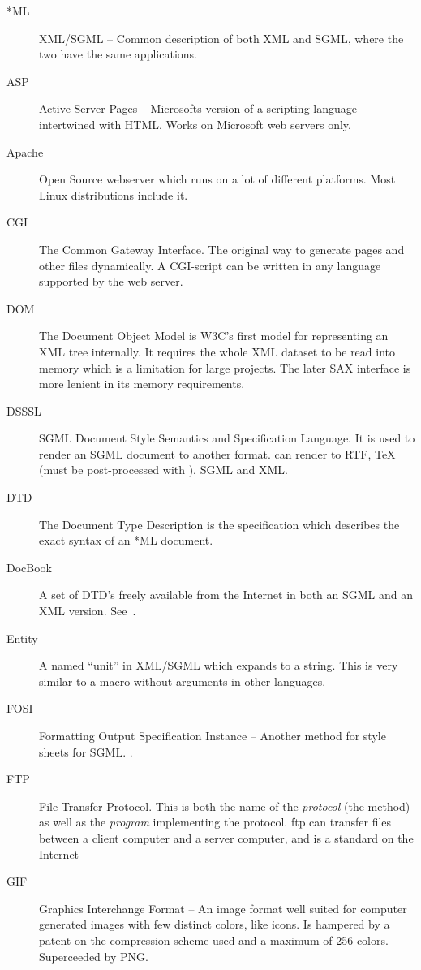 \begin{description}
\item[*ML] XML/SGML -- Common description of both XML and SGML, where the two have the same applications.
\item[ASP] Active Server Pages -- Microsofts version of a scripting language intertwined with HTML. Works on Microsoft web servers only.
\item[Apache] Open Source webserver which runs on a lot of different platforms.  Most Linux distributions include it.
\item[CGI] The Common Gateway Interface.  The original way to generate pages and other files dynamically.  A CGI-script can be written in any language supported by the web server.
\item[DOM] The Document Object Model is W3C's first model for representing an XML tree internally.  It requires the whole XML dataset to be read into memory which is a limitation for large projects.  The later SAX interface is more lenient in its memory requirements.
\item[DSSSL] SGML Document Style Semantics and Specification Language.  It is used to render an SGML document to another format.   can render to RTF, {\TeX} (must be post-processed with ), SGML and XML.
\item[DTD] The Document Type Description is the specification which describes the exact syntax of an *ML document.
\item[DocBook] A set of DTD's freely available from the Internet in both an SGML and an XML version.  See~.
\item[Entity] A named ``unit'' in XML/SGML which expands to a string.  This is very similar to a macro without arguments in other languages.
\item[FOSI] Formatting Output Specification Instance -- Another method
  for style sheets for SGML.
  .
\item[FTP] File Transfer Protocol.  This is both the name of the \textit{protocol} (the method) as well as the \textit{program} implementing the protocol.  ftp can transfer files between a client computer and a server computer, and is a standard on the Internet
\item[GIF] Graphics Interchange Format  -- An image format well suited for computer generated images with few distinct colors, like icons.  Is hampered by a patent on the compression scheme used and a maximum of 256 colors.  Superceeded by PNG.

\end{description}
